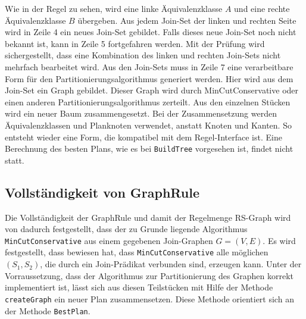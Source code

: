 Wie in der Regel zu sehen, wird eine linke Äquivalenzklasse $A$ und eine rechte Äquivalenzklasse $B$ übergeben. Aus jedem Join-Set der linken und rechten Seite wird in Zeile 4 ein neues Join-Set gebildet. Falls dieses neue Join-Set noch nicht bekannt ist, kann in Zeile 5 fortgefahren werden.  Mit der Prüfung wird sichergestellt, dass eine Kombination des linken und rechten Join-Sets nicht mehrfach bearbeitet wird. Aus den Join-Sets muss in Zeile 7 eine verarbeitbare Form für den Partitionierungsalgorithmus generiert werden. Hier wird aus dem Join-Set ein Graph gebildet. Dieser Graph wird durch MinCutConservative oder einen anderen Partitionierungsalgorithmus zerteilt. Aus den einzelnen Stücken wird ein neuer Baum zusammengesetzt. Bei der Zusammensetzung werden Äquivalenzklassen und Planknoten verwendet, anstatt Knoten und Kanten. So entsteht wieder eine Form, die kompatibel mit dem Regel-Interface ist. Eine Berechnung des besten Plans, wie es bei \texttt{BuildTree} vorgesehen ist, findet nicht statt.



\subsection{Vollständigkeit von GraphRule}
Die Vollständigkeit der GraphRule und damit der Regelmenge RS-Graph wird von \cite{shanbhag2014optimizing} dadurch festgestellt, dass der zu Grunde liegende Algorithmus \texttt{Min\-Cut\-Conserva\-tive} aus einem gegebenen Join-Graphen $G = (V,E)$. Es wird festgestellt, dass \cite{fender2012effective} bewiesen hat, dass \texttt{Min\-Cut\-Conservative} alle möglichen $(S_1, S_2)$, die durch ein Join-Prädikat verbunden sind, erzeugen kann. Unter der Vorraussetzung, dass der Algorithmus zur Partitionierung des Graphen korrekt implementiert ist, lässt sich aus diesen Teilstücken mit Hilfe der Methode \texttt{createGraph} ein neuer Plan zusammensetzen. Diese Methode orientiert sich an der Methode \texttt{BestPlan}.



